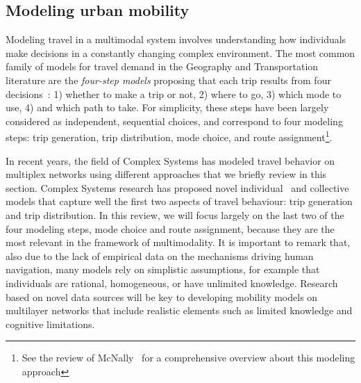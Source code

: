 \subsection{Modeling urban mobility \label{mobility_1}}

Modeling travel in a multimodal system involves understanding how individuals make decisions in a constantly changing complex environment. The most common family of models for travel demand in the Geography and Transportation literature are the \emph{four-step models} proposing that each trip results from four decisions~\cite{mcnally2000four}: 1) whether to make a trip or not, 2) where to go, 3) which mode to use, 4) and which path to take. For simplicity, these steps have been largely considered as independent, sequential choices, and correspond to four modeling steps: trip generation, trip distribution, mode choice, and route assignment\footnote{See the review of McNally~\cite{mcnally2000four} for a comprehensive overview about this modeling approach}.

In recent years, the field of Complex Systems has modeled travel behavior on multiplex networks using different approaches that we briefly review in this section. Complex Systems research has proposed novel individual~\cite{song2010modelling,jiang2016timegeo,alessandretti2020scales} and collective~\cite{simini2012universal,schlapfer2020hidden} models that capture well the first two aspects of travel behaviour: trip generation and trip distribution. In this review, we will focus largely on the last two of the four modeling steps, mode choice and route assignment, because they are the most relevant in the framework of multimodality. It is important to remark that, also due to the lack of empirical data on the mechanisms driving human navigation, many models rely on simplistic assumptions, for example that individuals are rational, homogeneous, or have unlimited knowledge. Research based on novel data sources will be key to developing mobility models on multilayer networks that include realistic elements such as limited knowledge and cognitive limitations.


